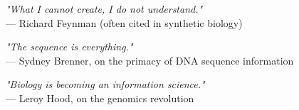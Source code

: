 \begin{flushright}
\emph{"What I cannot create, I do not understand."}\\
— Richard Feynman (often cited in synthetic biology)
\end{flushright}
\vspace{2em}
\begin{flushright}
\emph{"The sequence is everything."}\\
— Sydney Brenner, on the primacy of DNA sequence information
\end{flushright}
\vspace{2em}
\begin{flushright}
\emph{"Biology is becoming an information science."}\\
— Leroy Hood, on the genomics revolution
\end{flushright}